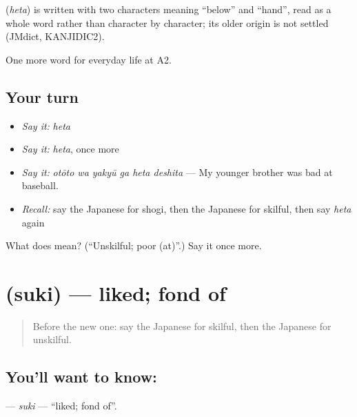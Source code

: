 \begin{cousinweb}
\textbf{} (\emph{heta}) is written with two characters meaning \textquotedblleft{}below\textquotedblright{} and \textquotedblleft{}hand\textquotedblright{}, read as a whole word rather than character by character; its older origin is not settled (JMdict, KANJIDIC2).
\end{cousinweb}

\begin{grammarlens}[title={What you've built}]
One more word for everyday life at A2.
\end{grammarlens}

\subsection*{Your turn}
\begin{itemize}
\raggedright
  \item \emph{Say it:} \emph{heta}
  \item \emph{Say it:} \emph{heta}, once more
  \item \emph{Say it:} \emph{otōto wa yakyū ga heta deshita} — My younger brother was bad at baseball.
  \item \emph{Recall:} say the Japanese for shogi, then the Japanese for skilful, then say \emph{heta} again
\end{itemize}

\begin{tcolorbox}[breakable,colback=teal!4,colframe=teal!35!black,title={Before you move on}]
What does  mean? (\textquotedblleft{}Unskilful; poor (at)\textquotedblright{}.) Say it once more.
\end{tcolorbox}
\section[\texorpdfstring{\ja{すき} (suki)}{すき (suki)}]{ (suki) — liked; fond of}

\label{lesson:JA-C240-suki}



\begin{quote}
Before the new one: say the Japanese for skilful, then the Japanese for unskilful.
\end{quote}

\subsection*{You'll want to know: }
\textbf{} — \emph{suki} — \textquotedblleft{}liked; fond of\textquotedblright{}.

